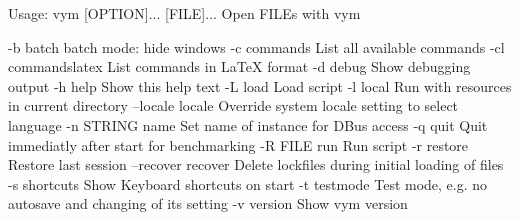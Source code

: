 Usage: vym [OPTION]... [FILE]...
Open FILEs with vym

-b           batch         batch mode: hide windows
-c           commands	    List all available commands
-cl          commandslatex List commands in LaTeX format
-d           debug         Show debugging output
-h           help          Show this help text
-L           load          Load script
-l           local         Run with resources in current directory
--locale     locale        Override system locale setting to select
                           language
-n  STRING   name          Set name of instance for DBus access
-q           quit          Quit immediatly after start for benchmarking
-R  FILE     run           Run script
-r           restore       Restore last session
--recover    recover       Delete lockfiles during initial loading of
                           files
-s           shortcuts     Show Keyboard shortcuts on start
-t           testmode      Test mode, e.g. no autosave and changing of
                           its setting
-v           version       Show vym version

